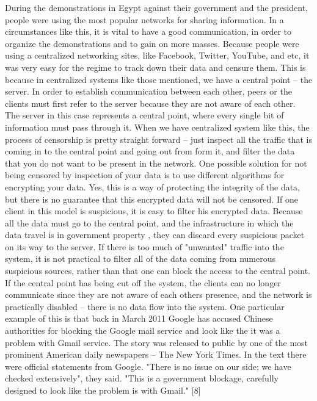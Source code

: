 During the demonstrations in Egypt against their government and the president, people were using the most popular networks for sharing information. In a circumstances like this, it is vital to have a good communication, in order to organize the demonstrations and to gain on more masses. 
Because people were using a centralized networking sites, like Facebook, Twitter, YouTube, and etc, it was very easy for the regime to track down their data and censure them. This is because in centralized systems like those mentioned, we have a central point – the server. 
In order to establish communication between each other, peers or the clients must first refer to the server because they are not aware of each other. The server in this case represents a central point, where every single bit of information must pass through it. When we have centralized system like this, the process of censorship is pretty straight forward – just inspect all the traffic that is coming in to the central point and going out from form it, and filter the data that you do not want to be present in the network. 
One possible solution for not being censored by inspection of your data is to use different algorithms for encrypting your data. Yes, this is a way of protecting the integrity of the data, but there is no guarantee that this encrypted data will not be censored. If one client in this model is suspicious, it is easy to filter his encrypted data. Because all the data must go to the central point, and the infrastructure in which the data travel is in government property \cite{dainotti2011}, they can discard every suspicious packet on its way to the server.
If there is too much of "unwanted" traffic into the system, it is not practical to filter all of the data coming from numerous suspicious sources, rather than that one can block the access to the central point. If the central point has being cut off the system, the clients can no longer communicate since they are not aware of each others presence, and the network is practically disabled – there is no data flow into the system. One particular example of this is that back in March 2011 Google has accused Chinese authorities for blocking the Google mail service and look like the it was a problem with Gmail service. The story was released to public by one of the most prominent American daily newspapers – The New York Times. In the text there were official statements from Google. "There is no issue on our side; we have checked extensively", they said. "This is a government blockage, carefully designed to look like the problem is with Gmail." [8]

